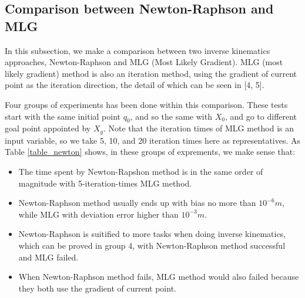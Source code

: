 \documentclass[letterpaper, 10 pt, conference]{ieeeconf}  %
\begin{document}
\subsection{Comparison between Newton-Raphson and MLG}

In this subsection, we make a comparison between two inverse kinematics approaches, Newton-Raphson and MLG (Most Likely Gradient). MLG (most likely gradient) method is also an iteration method, using the gradient of current point as the iteration direction, the detail of which can be seen in [4, 5]. 

Four groups of experiments has been done within this comparison. These tests start with the same initial point $q_0$, and so the same with $X_0$, and go to different goal point appointed by $X_{g}$. Note that the iteration times of MLG method is an input variable,  so we take 5, 10, and 20 iteration times here as representatives. As Table \ref{table_newton} shows, in these groups of exprements, we make sense that:

\begin{itemize}

\item  The time spent by Newton-Rapshon method is in the same order of magnitude with 5-iteration-times MLG method.
\item  Newton-Raphson method usually ends up with bias no more than $10^{-6}m$, while MLG with deviation error higher than $10^{-3}m$.
\item Newton-Raphson is suitified to more tasks when doing inverse kinematics, which can be proved in group 4, with Newton-Raphson method successful and MLG failed.
\item When Newton-Raphson method fails, MLG method would also failed because they both use the gradient of current point. 

\end{itemize}
\end{document}
